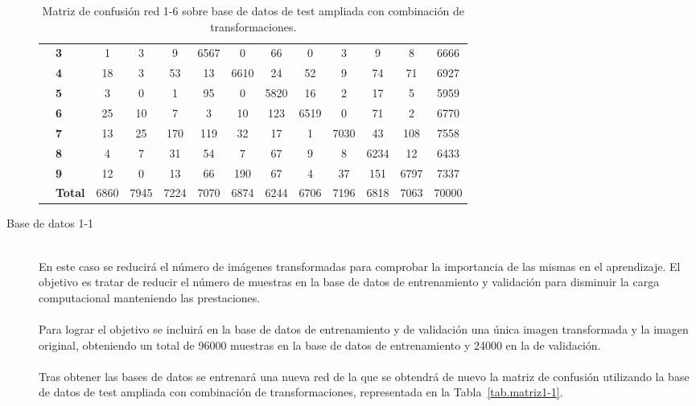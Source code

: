 \begin{description}
\begin{table}[H]
\begin{tabular}{|c|l|c|c|c|c|c|c|c|c|c|c|c|}
			& \textbf{3} & 1 & 3 & 9 & \cellcolor{lightgray}6567 & 0 & 66 & 0 & 3 & 9 & 8 & 6666\\ \cline{2-13}
			& \textbf{4} & 18 & 3 & 53 & 13 & \cellcolor{lightgray}6610 & 24 & 52 & 9 & 74 & 71 & 6927\\ \cline{2-13}
			& \textbf{5} & 3 & 0 & 1 & 95 & 0 & \cellcolor{lightgray}5820 & 16 & 2 & 17 & 5 &5959\\ \cline{2-13}
			& \textbf{6} & 25 & 10 & 7 & 3 & 10 & 123 & \cellcolor{lightgray}6519 & 0 & 71 & 2 & 6770\\ \cline{2-13}
			& \textbf{7} & 13 & 25 & 170 & 119 & 32 & 17 & 1 & \cellcolor{lightgray}7030 & 43 & 108 & 7558\\ \cline{2-13}
			& \textbf{8} & 4 & 7 & 31 & 54 & 7 & 67 & 9 & 8 & \cellcolor{lightgray}6234 & 12 & 6433\\ \cline{2-13}
			& \textbf{9} & 12 & 0 & 13 & 66 & 190 & 67 & 4 & 37 & 151 & \cellcolor{lightgray}6797 & 7337\\ \cline{2-13}
			& \textbf{Total} & 6860 & 7945 & 7224 & 7070 & 6874 & 6244 & 6706 & 7196 & 6818 & 7063 & 70000\\ \hline
		\end{tabular}
		\caption{Matriz de confusión red 1-6 sobre base de datos de test ampliada con combinación de transformaciones.}
		\label{tab.matriz1-6}
	\end{table}
	\item[Base de datos 1-1] \hfill 
	\vspace{5pt}
	\\
	En este caso se reducirá el número de imágenes transformadas para comprobar la importancia de las mismas en el aprendizaje. El objetivo es tratar de reducir el número de muestras en la base de datos de entrenamiento y validación para disminuir la carga computacional manteniendo las prestaciones.\\
	\vspace{-10pt}
	\\
	Para lograr el objetivo se incluirá en la base de datos de entrenamiento y de validación una única imagen transformada y la imagen original, obteniendo un total de 96000 muestras en la base de datos de entrenamiento y 24000 en la de validación.\\
	\vspace{-10pt}
	\\
	Tras obtener las bases de datos se entrenará una nueva red de la que se obtendrá de nuevo la matriz de confusión utilizando la base de datos de test ampliada con combinación de transformaciones, representada en la Tabla~\ref{tab.matriz1-1}.

\end{description}
